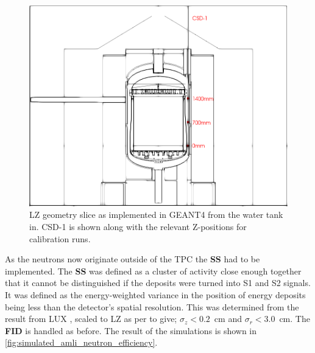 \begin{figure}[]
\centering
\includegraphics[width=\textwidth]{Figures/Geometry/csd1_geometry_black_and_white.png}
\caption{LZ geometry slice as implemented in GEANT4 from the water tank in. CSD-1 is shown along with the relevant Z-positions for calibration runs.}
\label{fig:CSD1_Geometry}
\end{figure}


\par
As the neutrons now originate outside of the TPC the \textbf{SS} had to be implemented.
The \textbf{SS} was defined as a cluster of activity close enough together that it cannot be distinguished if the deposits were turned into S1 and S2 signals.
It was defined as the energy-weighted variance in the position of energy deposits being less than the detector's spatial resolution.
This was determined from the result from LUX \cite{lux_position_reconstruction_ref}, scaled to LZ as per \cite{LZ_TechnicalDesignReview_ref} to give; ${\sigma}_{z}<0.2$~cm and ${\sigma}_{r}<3.0$~cm.
The \textbf{FID} is handled as before.
The result of the simulations is shown in \autoref{fig:simulated_amli_neutron_efficiency}.



